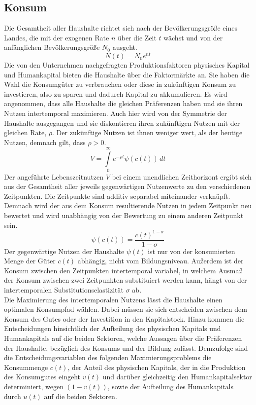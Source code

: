 \subsection*{Konsum}
Die Gesamtheit aller Haushalte richtet sich nach der Bevölkerungsgrö{\ss}e eines Landes, die mit der exogenen Rate $n$ über die Zeit $t$ wächst und von der anfänglichen Bevölkerungsgrö{\ss}e $N_0$ ausgeht.  
\begin{equation}
N(t)=N_0e^{nt}
\label{eq:Bevolkerungsentwickung}
\end{equation}
Die von den Unternehmen nachgefragten Produktionsfaktoren physisches Kapital und Humankapital bieten die Haushalte über die Faktormärkte an. Sie haben die Wahl die Konsumgüter zu verbrauchen oder diese in zukünftigen Konsum zu investieren, also zu sparen und dadurch Kapital zu akkumulieren. 
Es wird angenommen, dass alle Haushalte die gleichen Präferenzen haben und sie ihren Nutzen intertemporal maximieren. Auch hier wird von der Symmetrie der Haushalte ausgegangen und sie diskontieren ihren zukünftigen Nutzen mit der gleichen Rate, $\rho$. Der zukünftige Nutzen ist ihnen weniger wert, als der heutige Nutzen, demnach gilt, dass $\rho>0$. 
\begin{equation}
V=\int \limits_{0}^\infty  \! e^{-\rho t}\psi(c(t)) \, dt
\end{equation}
Der angeführte Lebenszeitnutzen $V$ bei einem unendlichen Zeithorizont ergibt sich aus der Gesamtheit aller jeweils gegenwärtigen Nutzenwerte zu den verschiedenen Zeitpunkten. Die Zeitpunkte sind additiv separabel miteinander verknüpft. Demnach wird der aus dem Konsum resultierende Nutzen in jedem Zeitpunkt neu bewertet und wird unabhängig von der Bewertung zu einem anderen Zeitpunkt sein.
\begin{equation}
\psi(c(t))=\frac{c(t)^{1-\sigma}}{1-\sigma}
\end{equation} 
Der gegenwärtige Nutzen der Haushalte $\psi(t)$ ist nur von der konsumierten Menge der Güter $c(t)$ abhängig, nicht vom Bildungsniveau. Au{\ss}erdem ist der Konsum zwischen den Zeitpunkten intertemporal variabel, in welchem Ausma{\ss} der Konsum zwischen zwei Zeitpunkten substituiert werden kann, hängt von der intertemporalen Substitutionselastizität $\sigma$ ab.\\
Die Maximierung des intertemporalen Nutzens lässt die Haushalte einen optimalen Konsumpfad wählen. Dabei müssen sie sich entscheiden zwischen dem Konsum  des Gutes oder der Investition in den Kapitalstock. Hinzu kommen die Entscheidungen hinsichtlich der Aufteilung des physischen Kapitals und Humankapitals auf die beiden Sektoren, welche Aussagen über die Präferenzen der Haushalte, bezüglich des Konsums und der Bildung zulässt. Demzufolge sind die Entscheidungsvariablen des folgenden Maximierungsproblems die Konsummenge $c(t)$, der Anteil des physischen Kapitals, der in die Produktion des Konsumgutes eingeht $v(t)$ und darüber gleichzeitig den Humankapitalsektor determiniert, wegen $(1-v(t))$, sowie der Aufteilung des Humankapitals durch $u(t)$ auf die beiden Sektoren.\\
